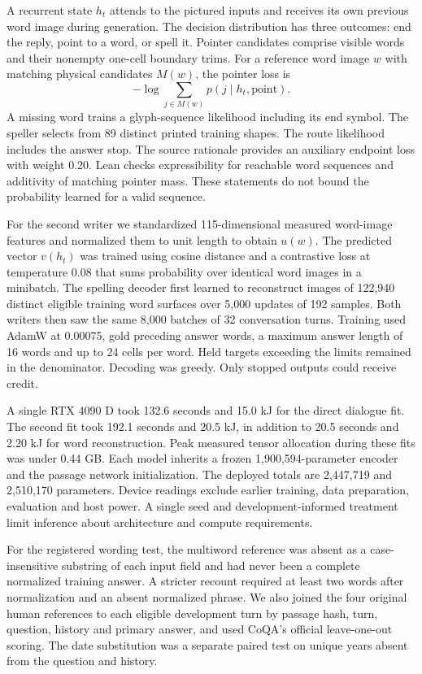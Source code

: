 \documentclass[12pt,a4paper]{article}
\providecommand{\DIFadd}[1]{{\protect\color{blue} \sf #1}} %
\begin{document}
\DIFadd{A recurrent state $h_t$ attends to the pictured inputs and receives its own previous word image during generation. The decision distribution has three outcomes: end the reply, point to a word, or spell it. Pointer candidates comprise visible words and their nonempty one-cell boundary trims. For a reference word image $w$ with matching physical candidates $M(w)$, the pointer loss is
}\[
 -\log \sum_{j\in M(w)}p(j\mid h_t,\mathrm{point}).
\]
\DIFadd{A missing word trains a glyph-sequence likelihood including its end symbol. The speller selects from 89 distinct printed training shapes. The route likelihood includes the answer stop. The source rationale provides an auxiliary endpoint loss with weight 0.20. Lean checks expressibility for reachable word sequences and additivity of matching pointer mass. These statements do not bound the probability learned for a valid sequence.
}

\DIFadd{For the second writer we standardized 115-dimensional measured word-image features and normalized them to unit length to obtain $u(w)$. The predicted vector $v(h_t)$ was trained using cosine distance and a contrastive loss at temperature 0.08 that sums probability over identical word images in a minibatch. The spelling decoder first learned to reconstruct images of 122,940 distinct eligible training word surfaces over 5,000 updates of 192 samples. Both writers then saw the same 8,000 batches of 32 conversation turns. Training used AdamW at 0.00075, gold preceding answer words, a maximum answer length of 16 words and up to 24 cells per word. Held targets exceeding the limits remained in the denominator. Decoding was greedy. Only stopped outputs could receive credit.
}

\DIFadd{A single RTX 4090 D took 132.6 seconds and 15.0 kJ for the direct dialogue fit. The second fit took 192.1 seconds and 20.5 kJ, in addition to 20.5 seconds and 2.20 kJ for word reconstruction. Peak measured tensor allocation during these fits was under 0.44 GB. Each model inherits a frozen 1,900,594-parameter encoder and the passage network initialization. The deployed totals are 2,447,719 and 2,510,170 parameters. Device readings exclude earlier training, data preparation, evaluation and host power. A single seed and development-informed treatment limit inference about architecture and compute requirements.
}

\DIFadd{For the registered wording test, the multiword reference was absent as a case-insensitive substring of each input field and had never been a complete normalized training answer. A stricter recount required at least two words after normalization and an absent normalized phrase. We also joined the four original human references to each eligible development turn by passage hash, turn, question, history and primary answer, and used CoQA's official leave-one-out scoring. The date substitution was a separate paired test on unique years absent from the question and history.
}
\end{document}
